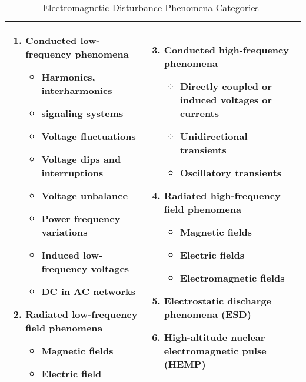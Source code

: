 \begin{table}[!t]
\centering \scriptsize
\renewcommand{\tabcolsep}{0.08cm}
\caption{Electromagnetic Disturbance Phenomena Categories~\cite{iec_61000}}
\begin{tabular}{m{7.5cm} m{7.5cm}}
\hline \hline
\begin{enumerate} [itemsep=0pt,topsep=4pt]
\item \textbf{Conducted low-frequency phenomena}
\begin{itemize}[itemsep=0pt,topsep=0pt]
\item Harmonics, interharmonics
\item signaling systems
\item Voltage fluctuations
\item Voltage dips and interruptions
\item Voltage unbalance
\item Power frequency variations
\item Induced low-frequency voltages
\item DC in AC networks
\end{itemize}

\item \textbf{Radiated low-frequency field phenomena}
\begin{itemize}[itemsep=0pt,topsep=0pt]
\item Magnetic fields
\item Electric field
\end{itemize}
\end{enumerate} & 
\begin{enumerate}[itemsep=0pt,topsep=4pt]
\setcounter{enumi}{2} 
\item \textbf{Conducted high-frequency phenomena}
\begin{itemize}[itemsep=0pt,topsep=0pt]
\item Directly coupled or induced voltages or currents
\item Unidirectional transients
\item Oscillatory transients
\end{itemize}

\item \textbf{Radiated high-frequency field phenomena}
\begin{itemize}[itemsep=0pt,topsep=0pt]
\item Magnetic fields
\item Electric fields
\item Electromagnetic fields
\end{itemize}
\item \textbf{Electrostatic discharge phenomena (ESD)}
\item \textbf{High-altitude nuclear electromagnetic pulse (HEMP)}
\end{enumerate}
\\
\hline
\end{tabular}
\label{tbl:iec_classification}
\end{table}


